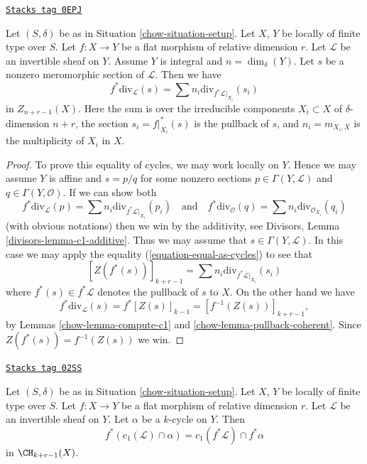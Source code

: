 \begin{lemma}
\label{chow-lemma-prepare-flat-pullback-cap-c1}
\href{https://stacks.math.columbia.edu/tag/0EPJ}{\texttt{Stacks tag 0EPJ}}

Let $(S, \delta)$ be as in Situation \ref{chow-situation-setup}.
Let $X$, $Y$ be locally of finite type over $S$.
Let $f : X \to Y$ be a flat morphism of relative dimension $r$.
Let $\mathcal{L}$ be an invertible sheaf on $Y$.
Assume $Y$ is integral and $n = \dim_\delta(Y)$.
Let $s$ be a nonzero meromorphic section of $\mathcal{L}$.
Then we have
$$
f^*\text{div}_\mathcal{L}(s) = \sum n_i\text{div}_{f^*\mathcal{L}|_{X_i}}(s_i)
$$
in $Z_{n + r - 1}(X)$. Here the sum is over the irreducible
components $X_i \subset X$ of $\delta$-dimension $n + r$,
the section $s_i = f|_{X_i}^*(s)$ is the pullback of $s$, and
$n_i = m_{X_i, X}$ is the multiplicity of $X_i$ in $X$.
\end{lemma}

\begin{proof}

To prove this equality of cycles, we may work locally on $Y$.
Hence we may assume $Y$ is affine and $s = p/q$ for some nonzero
sections $p \in \Gamma(Y, \mathcal{L})$ and $q \in \Gamma(Y, \mathcal{O})$.
If we can show both
$$
f^*\text{div}_\mathcal{L}(p) =
\sum n_i\text{div}_{f^*\mathcal{L}|_{X_i}}(p_i)
\quad\text{and}\quad
f^*\text{div}_\mathcal{O}(q) =
\sum n_i\text{div}_{\mathcal{O}_{X_i}}(q_i)
$$
(with obvious notations) then we win by the
additivity, see Divisors, Lemma \ref{divisors-lemma-c1-additive}.
Thus we may assume that $s \in \Gamma(Y, \mathcal{L})$.
In this case we may apply the equality
(\ref{equation-equal-as-cycles}) to see that
$$
[Z(f^*(s))]_{k + r - 1} =
\sum n_i\text{div}_{f^*\mathcal{L}|_{X_i}}(s_i)
$$
where $f^*(s) \in f^*\mathcal{L}$ denotes the pullback of $s$ to $X$.
On the other hand we have
$$
f^*\text{div}_\mathcal{L}(s) = f^*[Z(s)]_{k - 1}
= [f^{-1}(Z(s))]_{k + r - 1},
$$
by Lemmas \ref{chow-lemma-compute-c1} and \ref{chow-lemma-pullback-coherent}.
Since $Z(f^*(s)) = f^{-1}(Z(s))$ we win.
\end{proof}

\begin{lemma}
\label{chow-lemma-flat-pullback-cap-c1}
\href{https://stacks.math.columbia.edu/tag/02SS}{\texttt{Stacks tag 02SS}}

Let $(S, \delta)$ be as in Situation \ref{chow-situation-setup}.
Let $X$, $Y$ be locally of finite type over $S$.
Let $f : X \to Y$ be a flat morphism of relative dimension $r$.
Let $\mathcal{L}$ be an invertible sheaf on $Y$.
Let $\alpha$ be a $k$-cycle on $Y$.
Then
$$
f^*(c_1(\mathcal{L}) \cap \alpha) = c_1(f^*\mathcal{L}) \cap f^*\alpha
$$
in $\CH_{k + r - 1}(X)$.
\end{lemma}

